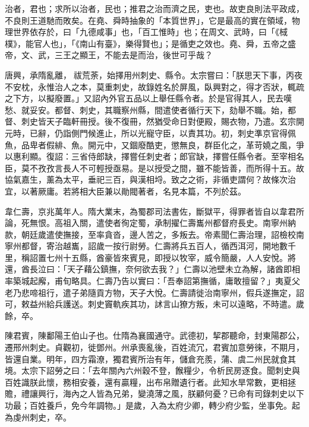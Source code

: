 
\begin{pinyinscope}

 治者，君也；求所以治者，民也；推君之治而濟之民，吏也。故吏良則法平政成，不良則王道馳而敗矣。在堯、舜時抽象的「本質世界」，它是最高的實在領域，物理世界依存於，曰「九德咸事」也，「百工惟時」也；在周文、武時，曰「《棫樸》，能官人也」，「《南山有臺》，樂得賢也」；是循吏之效也。堯、舜，五帝之盛帝，文、武，三王之顯王，不能去是而治，後世可乎哉？



 唐興，承隋亂離，祓荒荼，始擇用州刺史、縣令。太宗嘗曰：「朕思天下事，丙夜不安枕，永惟治人之本，莫重刺史，故錄姓名於屏風，臥興對之，得才否狀，輒疏之下方，以擬廢置。」又詔內外官五品以上舉任縣令者。於是官得其人，民去嘆愁、就妥安。都督、刺史，其職察州縣，間遣使者循行天下，劾舉不職。始，都督、刺史皆天子臨軒冊授。後不復冊，然猶受命日對便殿，賜衣物，乃遣。玄宗開元時，已辭，仍詣側門候進止，所以光寵守臣，以責其功。初，刺史準京官得佩魚，品卑者假緋、魚。開元中，又錮廢酷吏，懲無良，群臣化之，革苛嬈之風，爭以惠利顯。復詔：三省侍郎缺，擇嘗任刺史者；郎官缺，擇嘗任縣令者。至宰相名臣，莫不孜孜言長人不可輕授亟易。是以授受之間，雖不能皆善，而所得十五。故協氣嘉生，薰為太平，垂祀三百，與漢相埒。致之之術，非循吏謂何？故條次治宜，以著厥庸。若將相大臣兼以勛閥著者，名見本篇，不列於茲。



 韋仁壽，京兆萬年人。隋大業末，為蜀郡司法書佐，斷獄平，得罪者皆自以韋君所論，死無恨。高祖入關，遣使者徇定蜀，承制擢仁壽巂州都督府長史。南寧州納款，朝廷歲遣使撫接，至率貪沓，邊人苦之，多叛去。帝素聞仁壽治理，詔檢校南寧州都督，寄治越巂，詔歲一按行尉勞。仁壽將兵五百人，循西洱河，開地數千里，稱詔置七州十五縣，酋豪皆來賓見，即授以牧宰，威令簡嚴，人人安悅。將還，酋長泣曰：「天子藉公鎮撫，奈何欲去我？」仁壽以池壁未立為解，諸酋即相率築城起廨，甫旬略具。仁壽乃告以實曰：「吾奉詔第撫循，庸敢擅留？」夷夏父老乃悲啼祖行，遣子弟隨貢方物，天子大悅。仁壽請徙治南寧州，假兵遂撫定，詔可，敕益州給兵護送。刺史竇軌疾其功，訹言山獠方叛，未可以遠略，不時遣。歲餘，卒。



 陳君賓，陳鄱陽王伯山子也。仕隋為襄國通守。武德初，挈郡聽命，封東陽郡公，遷邢州刺史。貞觀初，徙鄧州。州承喪亂後，百姓流冗，君賓加意勞徠，不期月，皆還自業。明年，四方霜潦，獨君賓所治有年，儲倉充羨，蒲、虞二州民就食其境。太宗下詔勞之曰：「去年關內六州穀不登，餱糧少，令析民房逐食。聞刺史與百姓識朕此懷，務相安養，還有贏糧，出布帛贈遺行者。此知水旱常數，更相拯贍，禮讓興行，海內之人皆為兄弟，變澆薄之風，朕顧何憂？已命有司錄刺史以下功最；百姓養戶，免今年調物。」是歲，入為太府少卿，轉少府少監，坐事免。起為虔州刺史，卒。




\end{pinyinscope}
